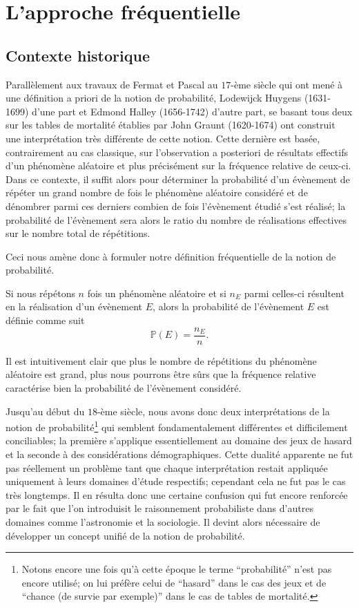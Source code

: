 \documentclass[11pt,a4paper]{article}
\begin{document}
\section{L'approche fréquentielle}

\subsection{Contexte historique}

Parallèlement aux travaux de Fermat et Pascal au $17$-ème siècle qui ont mené à une définition a priori de la notion de probabilité, Lodewijck Huygens (1631-1699) d'une part et Edmond Halley (1656-1742) d'autre part, se basant tous deux sur les tables de mortalité établies par John Graunt (1620-1674) ont construit une interprétation très différente de cette notion. Cette dernière est basée, contrairement au cas classique, sur l'observation a posteriori de résultats effectifs d'un phénomène aléatoire et plus précisément sur la fréquence relative de ceux-ci. Dans ce contexte, il suffit alors pour déterminer la probabilité d'un évènement de répéter un grand nombre de fois le phénomène aléatoire considéré et de dénombrer parmi ces derniers combien de fois l'évènement étudié s'est réalisé; la probabilité de l'évènement sera alors le ratio du nombre de réalisations effectives sur le nombre total de répétitions.

Ceci nous amène donc à formuler notre définition fréquentielle de la notion de probabilité.

\begin{Def}[Fréquentielle]{\rm Si nous répétons $n$ fois un phénomène aléatoire et si $n_E$ parmi celles-ci résultent en la réalisation d'un évènement $E$, alors la probabilité de l'évènement $E$ est définie comme suit
\[\mathbb{P}(E) = \frac{n_E}{n}.\]
}
\end{Def}

Il est intuitivement clair que plus le nombre de répétitions du phénomène aléatoire est grand, plus nous pourrons être sûrs que la fréquence relative caractérise bien la probabilité de l'évènement considéré.

Jusqu'au début du $18$-ème siècle, nous avons donc deux interprétations de la notion de probabilité\footnote{Notons encore une fois qu'à cette époque le terme ``probabilité'' n'est pas encore utilisé; on lui préfère celui de ``hasard'' dans le cas des jeux et de ``chance (de survie par exemple)'' dans le cas de tables de mortalité.} qui semblent fondamentalement différentes et difficilement conciliables; la première s'applique essentiellement au domaine des jeux de hasard et la seconde à des considérations démographiques. Cette dualité apparente ne fut pas réellement un problème tant que chaque interprétation restait appliquée uniquement à leurs domaines d'étude respectifs; cependant cela ne fut pas le cas très longtemps. Il en résulta donc une certaine confusion qui fut encore renforcée par le fait que l'on introduisit le raisonnement probabiliste dans d'autres domaines comme l'astronomie et la sociologie. Il devint alors nécessaire de développer un concept unifié de la notion de probabilité.
\end{document}
